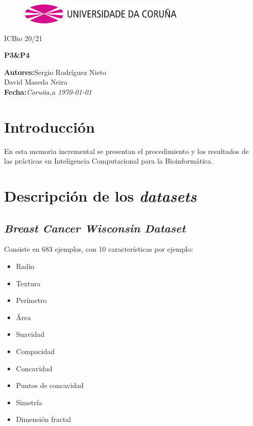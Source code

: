 \documentclass[a4paper,openwrite,12pt]{article}
\begin{document}
\begin{titlepage}

\begin{center}
\vspace*{-1in}
\begin{figure}[htb]
\begin{center}
\includegraphics[width=8cm]{img/udc.png}
\end{center}
\end{figure}

\vspace*{1in}
ICBio 20/21 \\
\vspace*{1in}
\begin{Large}
\textbf{P3\&P4} \\
\end{Large}

\vspace*{3in}

\begin{large}
\raggedleft
\textbf{Autores:}Sergio Rodríguez Nieto \\
David Maseda Neira \\
\textbf{Fecha:}\textit{Coruña,a \today}\\
\end{large}

\end{center}
\end{titlepage} 
\tableofcontents
{}
\newpage
\section{Introducción}
En esta memoria incremental se presentan el procedimiento y los resultados de las prácticas en Inteligencia Computacional para la Bioinformática.

\section{Descripción de los \textit{datasets}}
\subsection{\textit{Breast Cancer Wisconsin Dataset}}
Consiste en  683 ejemplos, con 10 características por ejemplo:
\begin{itemize}
    \item Radio
    \item Textura
    \item Perímetro
    \item Área
    \item Suavidad
    \item Compacidad
    \item Concavidad
    \item Puntos de concavidad
    \item Simetría
    \item Dimensión fractal
\end{itemize}
\end{document}
